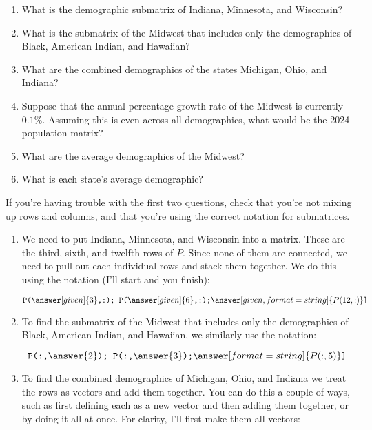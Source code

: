 \documentclass{ximera}
\begin{document}
  \begin{example}


\begin{enumerate}
\item What is the demographic submatrix of Indiana, Minnesota, and Wisconsin?
\item What is the submatrix of the Midwest that includes only the
  demographics of Black, American Indian, and Hawaiian?
\item What are the combined demographics of the states Michigan, Ohio,
  and Indiana?
\item Suppose that the annual percentage growth rate of the Midwest is
  currently $0.1\%$. Assuming this is even across all demographics,
  what would be the 2024 population matrix?
\item What are the average demographics of the Midwest?
\item What is each state's average demographic? 
\end{enumerate}

\begin{hint}

  If you're having trouble with the first two questions, check that you're not mixing up rows and columns, and that you're using the correct notation for submatrices.

\end{hint}

\begin{solution}
  \begin{enumerate}
  \item We need to put Indiana, Minnesota, and Wisconsin into a matrix. These are the third, sixth, and twelfth rows of $P$. Since none of them are connected, we need to pull out each individual rows and stack them together. We do this using the notation (I'll start and you finish):

    \[
    \texttt{P(}\answer[given]{3}\texttt{,:); P(}\answer[given]{6}\texttt{,:);}\answer[given,format=string]{P(12,:)}\texttt{]} 
    \]
    \item To find the submatrix of the Midwest that includes only the
      demographics of Black, American Indian, and Hawaiian, we similarly use the notation:

      \[
      \texttt{P(:,}\answer{2}\texttt{); P(:,}\answer{3}\texttt{);}\answer[format=string]{P(:,5)}\texttt{]}
      \]
  \item To find the combined demographics of Michigan, Ohio, and
    Indiana we treat the rows as vectors and add them together. You can do this a couple of ways, such as first defining each as a new vector and then adding them together, or by doing it all at once. For clarity, I'll first make them all vectors:


\end{enumerate}
\end{solution}
\end{example}
\end{document}
